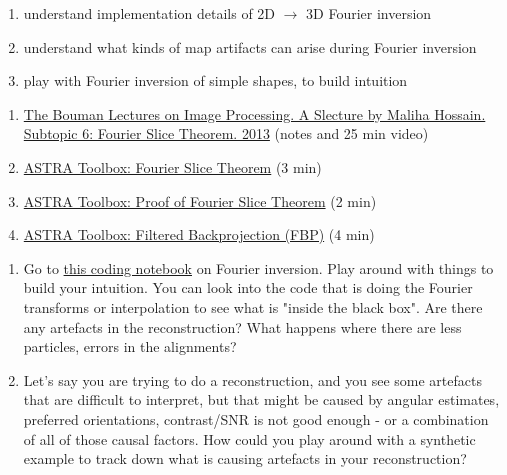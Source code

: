 \documentclass[11pt, oneside]{article}   	%
\begin{document}
\begin{enumerate}
  \item understand implementation details of 2D $\rightarrow$ 3D Fourier inversion
  \item understand what kinds of map artifacts can arise during Fourier inversion
  \item play with Fourier inversion of simple shapes, to build intuition
\end{enumerate}
\begin{enumerate}
	\item \href{https://www.projectrhea.org/rhea/index.php/ECE637_tomographic_reconstruction_fourier_slice_theorem_S13_mhossain}{The Bouman Lectures on Image Processing. A Slecture by Maliha Hossain. Subtopic 6: Fourier Slice Theorem. 2013} (notes and 25 min video)
 	\item \href{https://youtu.be/YIvTpW3IevI}{ASTRA Toolbox: Fourier Slice Theorem} (3 min)
	\item \href{https://youtu.be/DcmL1JGoiPs}{ASTRA Toolbox: Proof of Fourier Slice Theorem} (2 min)
	\item \href{https://youtu.be/pZ7JlXagT0w}{ASTRA Toolbox: Filtered Backprojection (FBP)} (4 min)
\end{enumerate}
\begin{enumerate}
	\item Go to \href{https://github.com/geoffwoollard/learn_cryoem_math/blob/master/nb/fourier_slice_2D_3D_with_trilinear.ipynb}{this coding notebook} on Fourier inversion. Play around with things to build your intuition. You can look into the code that is doing the Fourier transforms or interpolation to see what is "inside the black box". Are there any artefacts in the reconstruction? What happens where there are less particles, errors in the alignments?
	\item Let's say you are trying to do a reconstruction, and you see some artefacts that are difficult to interpret, but that might be caused by angular estimates, preferred orientations, contrast/SNR is not good enough - or a combination of all of those causal factors. How could you play around with a synthetic example to track down what is causing artefacts in your reconstruction?
\end{enumerate}


\pagebreak
\end{document}
